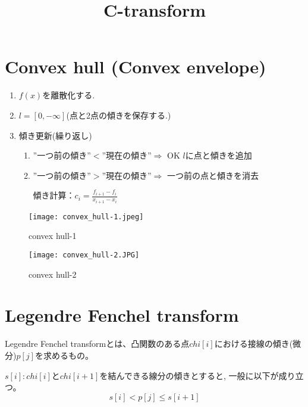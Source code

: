 \documentclass{jsarticle}
\theoremstyle{definition}
\begin{document}
\title{C-transform}

\maketitle

\section{Convex hull (Convex envelope)}


\begin{enumerate}
   \item $f(x)$を離散化する.
   \item $l = [0, - \infty ]$(点と2点の傾きを保存する.) 
   \item 傾き更新(繰り返し)
   \begin{enumerate}
   	\item ''一つ前の傾き''$ < $''現在の傾き''$\Rightarrow$ OK $l$に点と傾きを追加
   	\item ''一つ前の傾き''$ > $''現在の傾き''$\Rightarrow$ 一つ前の点と傾きを消去
   	
   	傾き計算：$c_i = \tfrac{f_{i+1} - f_i}{x_{i+1}- x_i}$
   \end{enumerate}
\end{enumerate}


\begin{figure}[htbp]
 \begin{minipage}{0.5\hsize}
  \begin{center}
   \texttt{[image: convex\_hull-1.jpeg]}
  \end{center}
  \caption{convex hull-1}
  \label{fig:one}
 \end{minipage}
 \begin{minipage}{0.5\hsize}
  \begin{center}
   \texttt{[image: convex\_hull-2.JPG]}
  \end{center}
  \caption{convex hull-2}
  \label{fig:two}
 \end{minipage}
\end{figure}

\section{Legendre Fenchel transform}
Legendre Fenchel transformとは、凸関数のある点$chi[i]$における接線の傾き(微分)$p[j]$を求めるもの。

$s[i]: chi[i]$と$chi[i+1]$を結んできる線分の傾きとすると, 一般に以下が成り立つ。
\[
s[i] < p[j] \leq s[i+1]
\]
\end{document}
